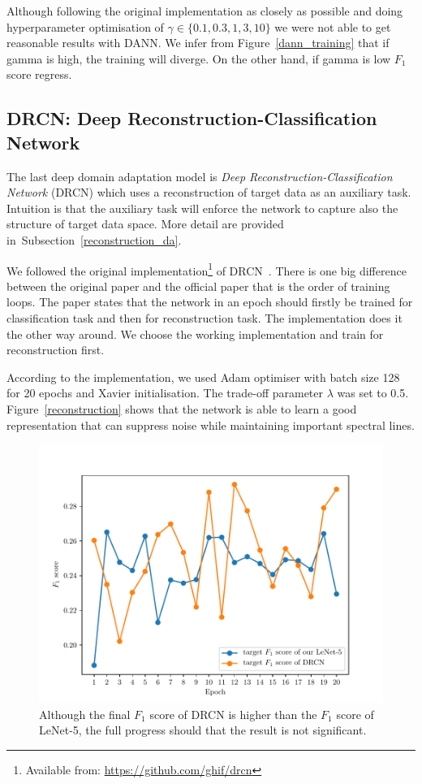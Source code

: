 Although following the original implementation as closely as possible
and doing hyperparameter optimisation of \(\gamma \in \{0.1, 0.3, 1, 3, 10\}\)
we were not able to get reasonable results with DANN.
We infer from Figure~\ref{dann_training} that
if gamma is high, the training will diverge.
On the other hand, if gamma is low \(F_1\) score regress.

\subsection{DRCN: Deep Reconstruction-Classification Network}

The last deep domain adaptation model is \textit{Deep Reconstruction-Classification Network} (DRCN)
which uses a reconstruction of target data as an auxiliary task.
Intuition is that the auxiliary task will enforce the network to capture also the structure of target data space.
More detail are provided in~Subsection~\ref{reconstruction_da}.

We followed the original implementation\footnote{Available from: \url{https://github.com/ghif/drcn}} of DRCN~\cite{ghifary2016}.
There is one big difference between the original paper and the official paper
that is the order of training loops.
The paper states that the network in an epoch
should firstly be trained for classification task
and then for reconstruction task.
The implementation does it the other way around.
We choose the working implementation and train for reconstruction first.

According to the implementation, we used Adam optimiser with batch size 128 for 20 epochs and Xavier initialisation.
The trade-off parameter \(\lambda\) was set to 0.5.
Figure~\ref{reconstruction} shows that the network is able to learn a good representation that can suppress noise
while maintaining important spectral lines.

\begin{figure}
\begin{center}
\includegraphics[width=.75\textwidth]{img/drcn_f1.pdf}
\end{center}
\caption[Comparison of \(F_1\) score of DRCN and LeNet-5]{
	Although the final \(F_1\) score of DRCN is higher than the \(F_1\) score of LeNet-5,
	the full progress should that the result is not significant.
}
\label{drcn_f1}
\end{figure}

